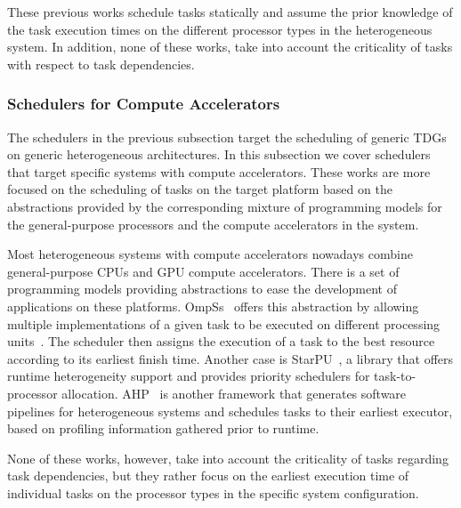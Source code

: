 These previous works schedule tasks statically and assume the prior knowledge of the task execution times on the different processor types in the heterogeneous system.
In addition, none of these works, take into account the criticality of tasks with respect to task dependencies.

\subsubsection{Schedulers for Compute Accelerators}

The schedulers in the previous subsection target the scheduling of generic TDGs on generic heterogeneous architectures. In this subsection we cover schedulers that target specific systems with compute accelerators. These works are more focused on the scheduling of tasks on the target platform based on the abstractions provided by the corresponding mixture of programming models for the general-purpose processors and the compute accelerators in the system.

Most heterogeneous systems with compute accelerators nowadays combine general-purpose CPUs and GPU compute accelerators. There is a set of programming models providing abstractions to ease the development of applications on these platforms. OmpSs~\cite{OmpSs_PPL11, OmpSs} offers this abstraction by allowing multiple implementations of a given task to be executed on different processing units~\cite{Judit}. The scheduler then assigns the execution of a task to the best resource according to its earliest finish time. Another case is StarPU~\cite{starpu}, a library that offers runtime heterogeneity support and provides priority schedulers for task-to-processor allocation. AHP~\cite{AHP} is another framework that generates software pipelines for heterogeneous systems and schedules tasks to their earliest executor, based on profiling information gathered prior to runtime.

None of these works, however, take into account the criticality of tasks regarding task dependencies, but they rather focus on the earliest execution time of individual tasks on the processor types in the specific system configuration.

